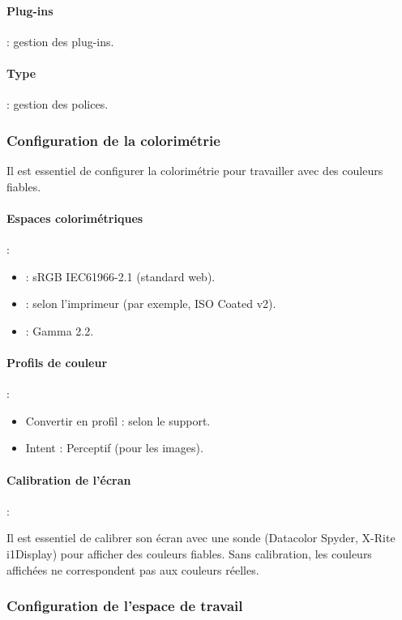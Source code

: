 \paragraph{Plug-ins} : gestion des plug-ins.

\paragraph{Type} : gestion des polices.

\subsubsection{Configuration de la colorimétrie}

Il est essentiel de configurer la colorimétrie pour travailler avec des couleurs fiables.

\paragraph{Espaces colorimétriques} :
\begin{itemize}
    \item {} : sRGB IEC61966-2.1 (standard web).
    \item {} : selon l'imprimeur (par exemple, ISO Coated v2).
    \item {} : Gamma 2.2.
\end{itemize}

\paragraph{Profils de couleur} :
\begin{itemize}
    \item Convertir en profil : selon le support.
    \item Intent : Perceptif (pour les images).
\end{itemize}

\paragraph{Calibration de l'écran} :

Il est essentiel de calibrer son écran avec une sonde (Datacolor Spyder, X-Rite i1Display) pour afficher des couleurs fiables. Sans calibration, les couleurs affichées ne correspondent pas aux couleurs réelles.

\subsubsection{Configuration de l'espace de travail}

